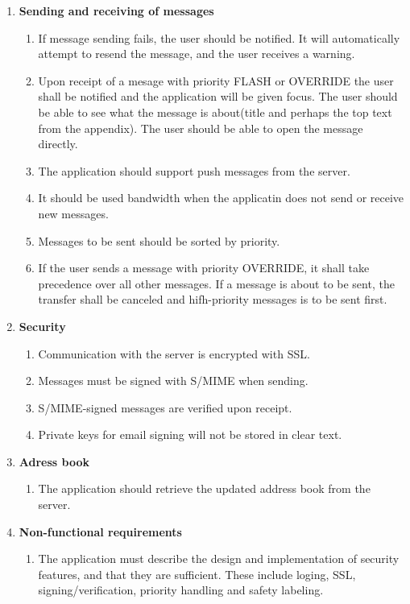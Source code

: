 \begin{enumerate}
\begin{enumerate}
\end{enumerate}
\item{}\textbf{Sending and receiving of messages}
\begin{enumerate}
\item{}If message sending fails, the user should be notified. It will automatically attempt to resend the message, and the user receives a warning.
\item{}Upon receipt of a mesage with priority FLASH or OVERRIDE the user shall be notified and the application will be given focus. The user should be able to see what the message is about(title and perhaps the top text from the appendix). The user should be able to open the message directly.
\item{}The application should support push messages from the server.
\item{}It should be used bandwidth when the applicatin does not send or receive new messages.
\item{}Messages to be sent should be sorted by priority.
\item{}If the user sends a message with priority OVERRIDE, it shall take precedence over all other messages. If a message is about to be sent, the transfer shall be canceled and hifh-priority messages is to be sent first.
\end{enumerate}
\item{}\textbf{Security}
\begin{enumerate}
\item{}Communication with the server is encrypted with SSL.
\item{}Messages must be signed with S/MIME when sending.
\item{}S/MIME-signed messages are verified upon receipt.
\item{}Private keys for email signing will not be stored in clear text.
\end{enumerate}
\item{}\textbf{Adress book}
\begin{enumerate}
\item{}The application should retrieve the updated address book from the server.
\end{enumerate}
\item{}\textbf{Non-functional requirements}
\begin{enumerate}
\item{}The application must describe the design and implementation of security features, and that they are sufficient. These include loging, SSL, signing/verification, priority handling and safety labeling.
\end{enumerate}
\end{enumerate}